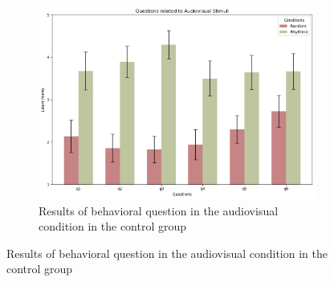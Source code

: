 \begin{figure}[htbp]
\begin{subfigure}[htbp]{0.5\textwidth}
        \centering
        \includegraphics[width=\textwidth]{bar_plots/plotbar_audiovisual_h.png}
        \caption{Results of behavioral question in the audiovisual condition in the control group}
        \label{fig: bar_audiovisual_control} 
    \end{subfigure} 
\end{figure}

